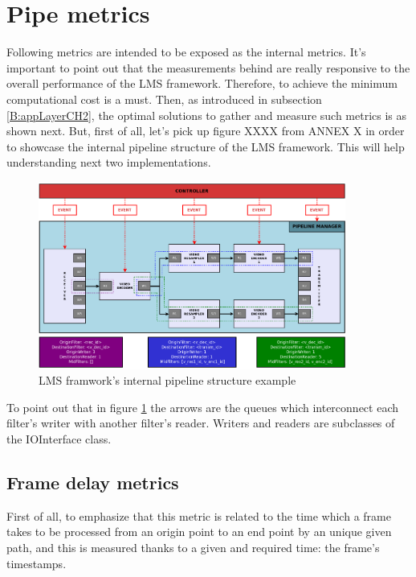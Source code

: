 \section{Pipe metrics}

Following metrics are intended to be exposed as the internal metrics. It's important to point out that the measurements behind are really responsive to the overall performance of the LMS framework. Therefore, to achieve the minimum computational cost is a must. Then, as introduced in subsection \ref{B:appLayerCH2}, the optimal solutions to gather and measure such metrics is as shown next. But, first of all, let's pick up figure XXXX from ANNEX X in order to showcase the internal pipeline structure of the LMS framework. This will help understanding next two implementations.

\begin{figure}[!htb]
\begin{center}
\includegraphics[width=0.9\textwidth]{./images/LMSpipelineBasicOne.png}
\caption{LMS framwork's internal pipeline structure example}
\label{F:lmsps}
\end{center}
\end{figure}

To point out that in figure \ref{F:lmsps} the arrows are the queues which interconnect each filter's writer with another filter's reader. Writers and readers are subclasses of the IOInterface class.

\subsection{Frame delay metrics}

First of all, to emphasize that this metric is related to the time which a frame takes to be processed from an origin point to an end point by an unique given path, and this is measured thanks to a given and required time: the frame's timestamps. 

